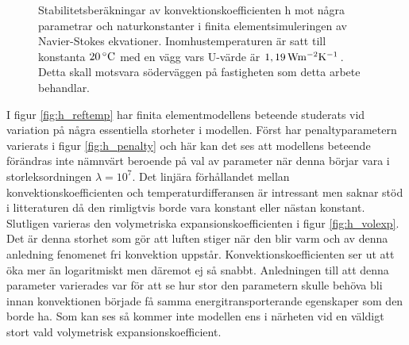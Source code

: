 \begin{figure}[hpbt]

\caption{\label{fig:konv_param}Stabilitetsberäkningar av konvektionskoefficienten h mot några
parametrar och naturkonstanter i finita elementsimuleringen av Navier-Stokes ekvationer.
Inomhustemperaturen är satt till konstanta $\unit[20]{^\circ C}$ med en vägg vars U-värde är
$\unit[1,19]{ Wm^{-2}K^{-1}}$. Detta skall motsvara söderväggen på fastigheten som detta arbete behandlar.}

\end{figure}

I figur \ref{fig:h_reftemp} har finita elementmodellens beteende studerats vid variation på några essentiella storheter i modellen.
Först har penaltyparametern varierats i figur \ref{fig:h_penalty} och här kan det ses att modellens beteende förändras inte nämnvärt
beroende på val av parameter när denna börjar vara i storleksordningen $\lambda = 10^7$. Det linjära förhållandet mellan
konvektionskoefficienten och temperaturdifferansen är intressant men saknar stöd i litteraturen då den rimligtvis borde vara
konstant eller nästan konstant. Slutligen varieras den volymetriska expansionskoefficienten
i figur \ref{fig:h_volexp}. Det är denna storhet
som gör att luften stiger när den blir varm och av denna anledning fenomenet fri konvektion uppstår. Konvektionskoefficienten
ser ut att öka mer än logaritmiskt men däremot ej så snabbt. Anledningen till att denna parameter varierades var för
att se hur stor den parametern skulle behöva bli innan konvektionen började få samma energitransporterande egenskaper
som den borde ha. Som kan ses så kommer inte modellen ens i närheten vid en väldigt stort vald volymetrisk expansionskoefficient.

